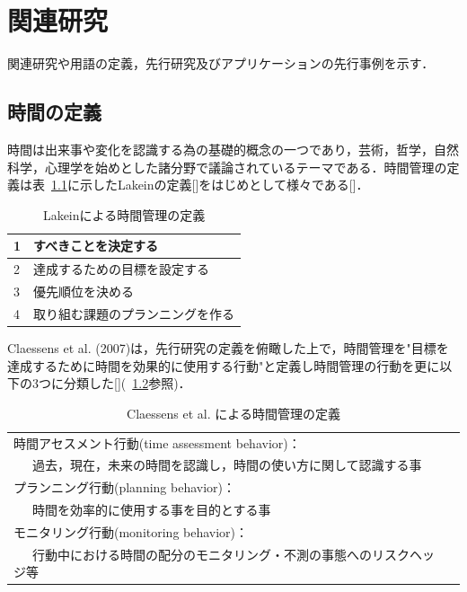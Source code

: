 \chapter{関連研究}
関連研究や用語の定義，先行研究及びアプリケーションの先行事例を示す．

\section{時間の定義}
時間は出来事や変化を認識する為の基礎的概念の一つであり，芸術，哲学，自然科学，心理学を始めとした諸分野で議論されているテーマである．時間管理の定義は表~\ref{tb:Lakein}に示したLakeinの定義[]をはじめとして様々である[]．

\begin{table}[htb]
\begin{center}
  \begin{tabular}{|l|l|} \hline
   1 & すべきことを決定する \\ \hline
   2 & 達成するための目標を設定する \\ \hline
   3 & 優先順位を決める \\ \hline
   4 & 取り組む課題のプランニングを作る \\ \hline
  \end{tabular}
  \caption{Lakeinによる時間管理の定義}
  \label{tb:Lakein}
\end{center}
\end{table}

Claessens et al. (2007)は，先行研究の定義を俯瞰した上で，時間管理を"目標を達成するために時間を効果的に使用する行動"と定義し時間管理の行動を更に以下の3つに分類した[](~\ref{tb:Claessens}参照)．

\begin{table}[htb]
\begin{center}
  \begin{tabular}{|l|l|} \hline
   時間アセスメント行動(time assessment behavior)： \\ ~~~過去，現在，未来の時間を認識し，時間の使い方に関して認識する事 \\ \hline
   プランニング行動(planning behavior)：　\\  ~~~時間を効率的に使用する事を目的とする事 \\ \hline
   モニタリング行動(monitoring behavior)： \\ ~~~行動中における時間の配分のモニタリング・不測の事態へのリスクヘッジ等 \\ \hline
  \end{tabular}
  \caption{Claessens et al. による時間管理の定義}
  \label{tb:Claessens}
\end{center}
\end{table}


